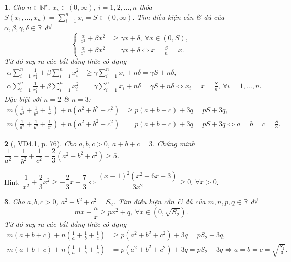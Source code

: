 \documentclass{article}
\newtheorem{baitoan}{}
\begin{document}
\begin{baitoan}
	Cho $n\in\mathbb{N}^\star$, $x_i\in(0,\infty)$, $i = 1,2,\ldots,n$ thỏa $S(x_1,\ldots,x_n) = \sum_{i=1}^n x_i = S\in(0,\infty)$. Tìm điều kiện cần \& đủ của $\alpha,\beta,\gamma,\delta\in\mathbb{R}$  để
	\begin{equation*}
		\left\{\begin{split}
			\frac{\alpha}{x^2} + \beta x^2&\ge\gamma x + \delta,\ \forall x\in(0,S),\\
			\frac{\alpha}{x^2} + \beta x^2 &= \gamma x + \delta\Leftrightarrow x = \frac{S}{n} = \bar{x}.
		\end{split}\right.
	\end{equation*}
	Từ đó suy ra các bất đẳng thức có dạng
	\begin{align*}
		\alpha\sum_{i=1}^n \frac{1}{x_1^2} + \beta\sum_{i=1}^n x_i^2&\ge\gamma\sum_{i=1}^n x_i + n\delta = \gamma S + n\delta,\\
		\alpha\sum_{i=1}^n \frac{1}{x_1^2} + \beta\sum_{i=1}^n x_i^2 &= \gamma\sum_{i=1}^n x_i + n\delta = \gamma S + n\delta\Leftrightarrow x_i = \bar{x} = \frac{S}{n},\ \forall i = 1,\ldots,n.
	\end{align*}	
	Đặc biệt với $n = 2$ \& $n = 3$:
	\begin{align}
		m\left(\frac{1}{a^2} + \frac{1}{b^2} + \frac{1}{c^2}\right) + n(a^2 + b^2 + c^2)&\ge p(a + b + c) + 3q = pS + 3q,\\
		m\left(\frac{1}{a^2} + \frac{1}{b^2} + \frac{1}{c^2}\right) + n(a^2 + b^2 + c^2) &= p(a + b + c) + 3q = pS + 3q\Leftrightarrow a = b = c = \frac{S}{3}.
	\end{align}
\end{baitoan}

\begin{baitoan}[\cite{Son_Nghiep_Trung_Can_bdt}, VD4.1, p. 76]
	Cho $a,b,c > 0$, $a + b + c = 3$. Chứng minh $\dfrac{1}{a^2} + \dfrac{1}{b^2} + \dfrac{1}{c^2} + \dfrac{2}{3}(a^2 + b^2 + c^2)\ge5$.
\end{baitoan}
{\sf Hint.} $\dfrac{1}{x^2} + \dfrac{2}{3}x^2\ge-\dfrac{2}{3}x + \dfrac{7}{3}\Leftrightarrow\dfrac{(x - 1)^2(x^2 + 6x + 3)}{3x^2}\ge0$, $\forall x > 0$.

\begin{baitoan}
	Cho $a,b,c > 0$, $a^2 + b^2 + c^2 = S_2$. Tìm điều kiện cần \& đủ của $m,n,p,q\in\mathbb{R}$ để
	\begin{equation*}
		mx + \frac{n}{x}\ge px^2 + q,\ \forall x\in(0,\sqrt{S_2}).
	\end{equation*}
	Từ đó suy ra các bất đẳng thức có dạng
	\begin{align*}
		m(a + b + c) + n\left(\frac{1}{a} + \frac{1}{b} + \frac{1}{c}\right)&\ge p(a^2 + b^2 + c^2) + 3q = pS_2 + 3q,\\
		m(a + b + c) + n\left(\frac{1}{a} + \frac{1}{b} + \frac{1}{c}\right) &= p(a^2 + b^2 + c^2) + 3q = pS_2 + 3q\Leftrightarrow a = b = c = \sqrt{\frac{S_2}{3}}.
	\end{align*}
\end{baitoan}
\end{document}
